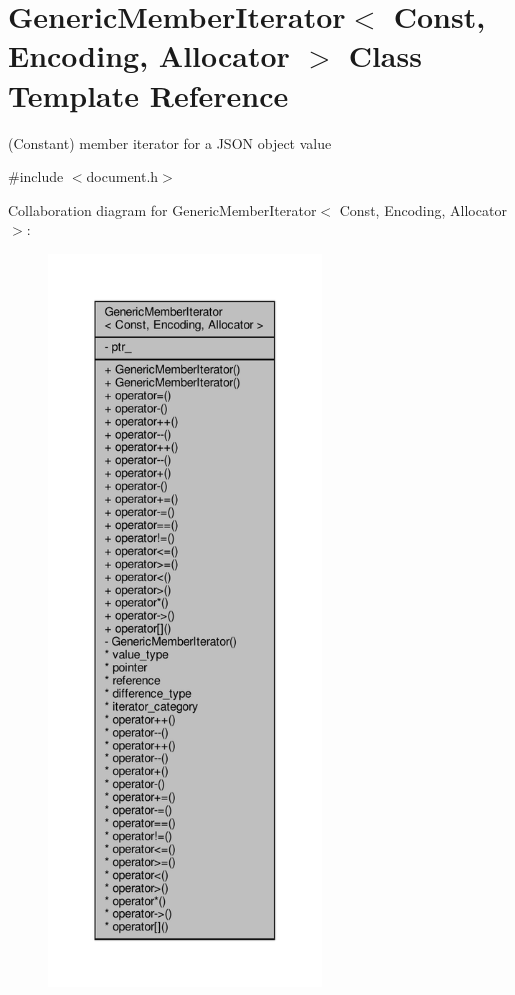 \hypertarget{classGenericMemberIterator}{}\section{Generic\+Member\+Iterator$<$ Const, Encoding, Allocator $>$ Class Template Reference}
\label{classGenericMemberIterator}


(Constant) member iterator for a J\+S\+ON object value  




{\ttfamily \#include $<$document.\+h$>$}



Collaboration diagram for Generic\+Member\+Iterator$<$ Const, Encoding, Allocator $>$\+:
\nopagebreak
\begin{figure}[H]
\begin{center}
\leavevmode
\includegraphics[height=550pt]{classGenericMemberIterator__coll__graph}
\end{center}
\end{figure}
